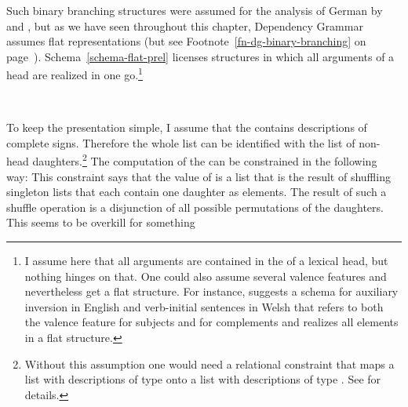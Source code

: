 Such binary branching structures were assumed for the analysis of German by \citet{Kathol95a,Kathol2000a} and
\citet{Mueller95c,Babel,Mueller99a,Mueller2002b}, but as we have seen throughout this chapter, Dependency
Grammar assumes flat representations (but see Footnote~\ref{fn-dg-binary-branching} on page~\pageref{fn-dg-binary-branching}). Schema~\ref{schema-flat-prel} licenses structures in which all arguments of a
head are realized in one go.\footnote{%
I assume here that all arguments are contained in the \subcatl of a
lexical head, but nothing hinges on that. One could also assume several valence features and
nevertheless get a flat structure. For instance, \citet[]{Borsley89} suggests a schema for auxiliary inversion in
English and verb-initial sentences in Welsh that refers to both the valence feature for subjects and for complements and realizes all
elements in a flat structure.%
}
\begin{schema}
\label{schema-flat-prel}
 \impl\\
\end{schema}
To keep the presentation simple, I assume that the \subcatl contains descriptions of complete
signs. Therefore the whole list can be identified with the list of non-head daughters.\footnote{
  Without this assumption one would need a relational constraint that maps a list with descriptions of type
   onto a list with descriptions of type . See  for details.
}
The computation of the \domv can be constrained in the following way:
\ea
{} \impl
{}
\z
This constraint says that the value of \dom is a list that is the result of shuffling singleton
lists that each contain one daughter as elements. The result of such a shuffle operation is a
disjunction of all possible permutations of the daughters. This seems to be overkill for something
